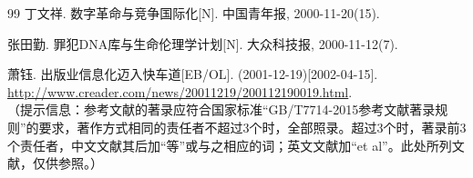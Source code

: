 \begin{thebibliography}{99}
 丁文祥. 数字革命与竞争国际化[N]. 中国青年报, 2000-11-20(15).

 张田勤. 罪犯DNA库与生命伦理学计划[N]. 大众科技报, 2000-11-12(7).

 萧钰. 出版业信息化迈入快车道[EB/OL]. (2001-12-19)[2002-04-15].  
\url{http://www.creader.com/news/20011219/200112190019.html}.\\
（提示信息：参考文献的著录应符合国家标准“GB/T7714-2015参考文献著录规则”的要求，著作方式相同的责任者不超过3个时，全部照录。超过3个时，著录前3个责任者，中文文献其后加“等”或与之相应的词；英文文献加“et al”。此处所列文献，仅供参照。）

\end{thebibliography}
